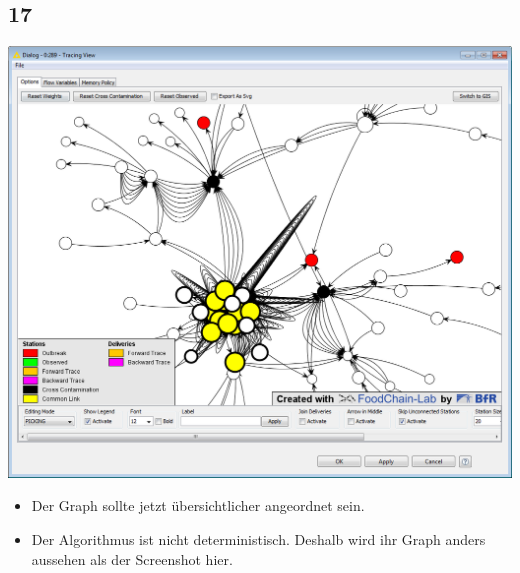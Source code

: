 \documentclass{beamer}
\begin{document}
\subsection{17}
\begin{frame}
	\begin{center}
  		\includegraphics[height=0.6\textheight]{17.png}
	\end{center}
	\begin{itemize}
		\item Der Graph sollte jetzt übersichtlicher angeordnet sein.
		\item Der Algorithmus ist nicht deterministisch. Deshalb wird ihr Graph anders aussehen als der Screenshot hier.
	\end{itemize}
\end{frame}
\end{document}
